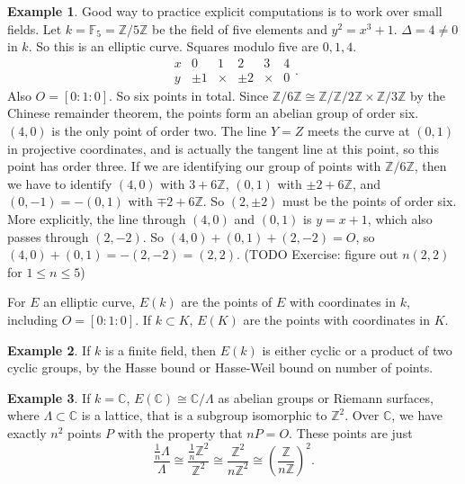 \documentclass{article}
\newcommand{\F}{\mathbb{F}}
\newcommand{\Z}{\mathbb{Z}}
\newcommand{\C}{\mathbb{C}}
\newcommand{\rb}[1]{\left( #1 \right)}
\renewcommand{\sb}[1]{\left[ #1 \right]}
\theoremstyle{definition}\newtheorem{definition}{Definition}[section]
\theoremstyle{definition}\newtheorem{remark}[definition]{Remark}
\theoremstyle{definition}\newtheorem*{example}{Example}
\theoremstyle{definition}\newtheorem*{note}{Note}
\begin{document}
\begin{example}
Good way to practice explicit computations is to work over small fields. Let $ k = \F_5 = \Z / 5\Z $ be the field of five elements and $ y^2 = x^3 + 1 $. $ \Delta = 4 \ne 0 $ in $ k $. So this is an elliptic curve. Squares modulo five are $ 0, 1, 4 $.
$$
\begin{array}{c|ccccc}
x & 0 & 1 & 2 & 3 & 4 \\
\hline
y & \pm 1 & \times & \pm 2 & \times & 0
\end{array}.
$$
Also $ O = \sb{0 : 1 : 0} $. So six points in total. Since $ \Z / 6\Z \cong \Z / \Z / 2\Z \times \Z / 3\Z $ by the Chinese remainder theorem, the points form an abelian group of order six. $ \rb{4, 0} $ is the only point of order two. The line $ Y = Z $ meets the curve at $ \rb{0, 1} $ in projective coordinates, and is actually the tangent line at this point, so this point has order three. If we are identifying our group of points with $ \Z / 6\Z $, then we have to identify $ \rb{4, 0} $ with $ 3 + 6\Z $, $ \rb{0, 1} $ with $ \pm 2 + 6\Z $, and $ \rb{0, -1} = -\rb{0, 1} $ with $ \mp 2 + 6\Z $. So $ \rb{2, \pm 2} $ must be the points of order six. More explicitly, the line through $ \rb{4, 0} $ and $ \rb{0, 1} $ is $ y = x + 1 $, which also passes through $ \rb{2, -2} $. So $ \rb{4, 0} + \rb{0, 1} + \rb{2, -2} = O $, so $ \rb{4, 0} + \rb{0, 1} = -\rb{2, -2} = \rb{2, 2} $. (TODO Exercise: figure out $ n\rb{2, 2} $ for $ 1 \le n \le 5 $)
\end{example}

For $ E $ an elliptic curve, $ E\rb{k} $ are the points of $ E $ with coordinates in $ k $, including $ O = \sb{0 : 1 : 0} $. If $ k \subset K $, $ E\rb{K} $ are the points with coordinates in $ K $.

\begin{example}
If $ k $ is a finite field, then $ E\rb{k} $ is either cyclic or a product of two cyclic groups, by the Hasse bound or Hasse-Weil bound on number of points.
\end{example}

\begin{example}
If $ k = \C $, $ E\rb{\C} \cong \C / \Lambda $ as abelian groups or Riemann surfaces, where $ \Lambda \subset \C $ is a lattice, that is a subgroup isomorphic to $ \Z^2 $. Over $ \C $, we have exactly $ n^2 $ points $ P $ with the property that $ nP = O $. These points are just
$$ \dfrac{\tfrac{1}{n}\Lambda}{\Lambda} \cong \dfrac{\tfrac{1}{n}\Z^2}{\Z^2} \cong \dfrac{\Z^2}{n\Z^2} \cong \rb{\dfrac{\Z}{n\Z}}^2. $$
\end{example}
\end{document}
